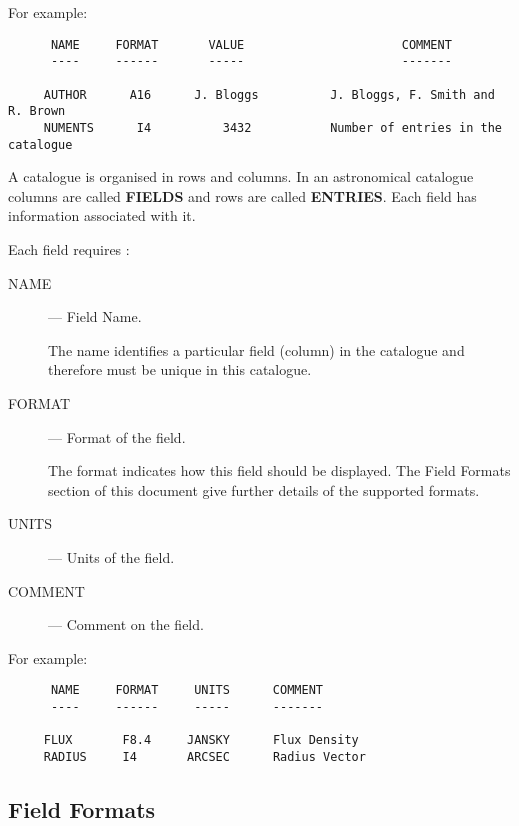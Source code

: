 For example:
\begin{small}
\begin{verbatim}
      NAME     FORMAT       VALUE                      COMMENT
      ----     ------       -----                      -------

     AUTHOR      A16      J. Bloggs          J. Bloggs, F. Smith and R. Brown
     NUMENTS      I4          3432           Number of entries in the catalogue
\end{verbatim}
\end{small}

A catalogue is organised in rows and columns. In an astronomical  catalogue 
columns are called 
{\bf FIELDS} and rows are called {\bf ENTRIES}. Each field has information 
associated with it.

Each field requires :
 
\begin{description}
\begin{description}
\item [NAME] --- Field Name. 

The name identifies a particular field (column) in the 
catalogue and therefore must be unique in this catalogue.

\item [FORMAT] --- Format of the field.

The format indicates how this field should be displayed. The Field Formats
section of this document give further details of the supported formats.

\item [UNITS] --- Units of the field.

\item [COMMENT] --- Comment on the field.

\end{description}
\end{description}

For example:

\begin{small}
\begin{verbatim}
      NAME     FORMAT     UNITS      COMMENT
      ----     ------     -----      -------

     FLUX       F8.4     JANSKY      Flux Density   
     RADIUS     I4       ARCSEC      Radius Vector
\end{verbatim}
\end{small}

\subsection {Field Formats}
 
